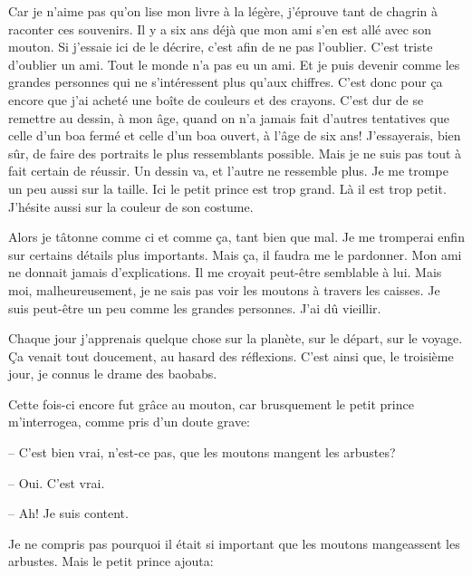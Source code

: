 \documentclass[a4paper]{report}
\begin{document}
Car je n'aime pas qu'on lise mon livre à la légère, j'éprouve tant de chagrin à raconter ces souvenirs. Il y a six ans déjà que mon ami s'en est allé avec son mouton. Si j'essaie ici de le décrire, c'est afin de ne pas l'oublier. C'est triste d'oublier un ami. Tout le monde n'a pas eu un ami. Et je puis devenir comme les grandes personnes qui ne s'intéressent plus qu'aux chiffres. C'est donc pour ça encore que j'ai acheté une boîte de couleurs et des crayons. C'est dur de se remettre au dessin, à mon âge, quand on n'a jamais fait d'autres tentatives que celle d'un boa fermé et celle d'un boa ouvert, à l'âge de six ans! J'essayerais, bien sûr, de faire des portraits le plus ressemblants possible. Mais je ne suis pas tout à fait certain de réussir. Un dessin va, et l'autre ne ressemble plus. Je me trompe un peu aussi sur la taille. Ici le petit prince est trop grand. Là il est trop petit. J'hésite aussi sur la couleur de son costume.

Alors je tâtonne comme ci et comme ça, tant bien que mal. Je me tromperai enfin sur certains détails plus importants. Mais ça, il faudra me le pardonner. Mon ami ne donnait jamais d'explications. Il me croyait peut-être semblable à lui. Mais moi, malheureusement, je ne sais pas voir les moutons à travers les caisses. Je suis peut-être un peu comme les grandes personnes. J'ai dû vieillir.

\parachapter[V]{} %
Chaque jour j'apprenais quelque chose sur la planète, sur le départ, sur le voyage. Ça venait tout doucement, au hasard des réflexions. C'est ainsi que, le troisième jour, je connus le drame des baobabs.

Cette fois-ci encore fut grâce au mouton, car brusquement le petit prince m'interrogea, comme pris d'un doute grave:

-- C'est bien vrai, n'est-ce pas, que les moutons mangent les arbustes?

-- Oui. C'est vrai.

-- Ah! Je suis content.

Je ne compris pas pourquoi il était si important que les moutons mangeassent les arbustes. Mais le petit prince ajouta:
\end{document}
